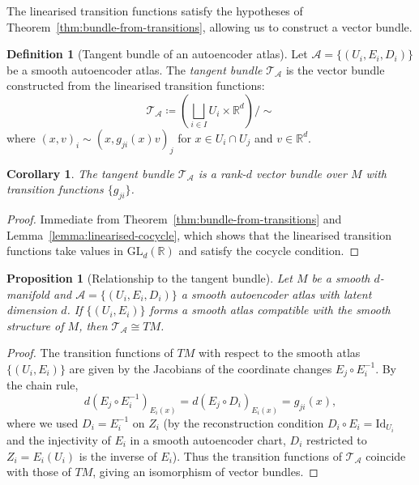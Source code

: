 \documentclass[11pt]{article}
\newcommand{\R}{\mathbb{R}}
\newcommand{\GL}{\mathrm{GL}}
\theoremstyle{plain}
\newtheorem{proposition}[theorem]{Proposition}
\newtheorem{corollary}[theorem]{Corollary}
\theoremstyle{definition}
\newtheorem{definition}[theorem]{Definition}
\theoremstyle{remark}
\begin{document}
The linearised transition functions satisfy the hypotheses of Theorem~\ref{thm:bundle-from-transitions}, allowing us to construct a vector bundle.

\begin{definition}[Tangent bundle of an autoencoder atlas]\label{def:tangent-bundle}
Let $\mathcal{A} = \{(U_i, E_i, D_i)\}$ be a smooth autoencoder atlas. The \emph{tangent bundle} $\mathcal{T}_{\mathcal{A}}$ is the vector bundle constructed from the linearised transition functions:
\[
\mathcal{T}_{\mathcal{A}} \coloneqq \left( \bigsqcup_{i \in I} U_i \times \R^d \right)\Big/ \sim
\]
where $(x, v)_i \sim (x, g_{ji}(x) v)_j$ for $x \in U_i \cap U_j$ and $v \in \R^d$.
\end{definition}

\begin{corollary}\label{cor:tangent-bundle-is-vector-bundle}
The tangent bundle $\mathcal{T}_{\mathcal{A}}$ is a rank-$d$ vector bundle over $M$ with transition functions $\{g_{ji}\}$.
\end{corollary}

\begin{proof}
Immediate from Theorem~\ref{thm:bundle-from-transitions} and Lemma~\ref{lemma:linearised-cocycle}, which shows that the linearised transition functions take values in $\GL_d(\R)$ and satisfy the cocycle condition.
\end{proof}

\begin{proposition}[Relationship to the tangent bundle]\label{prop:tangent-bundle-isomorphism}
Let $M$ be a smooth $d$-manifold and $\mathcal{A} = \{(U_i, E_i, D_i)\}$ a smooth autoencoder atlas with latent dimension $d$. If $\{(U_i, E_i)\}$ forms a smooth atlas compatible with the smooth structure of $M$, then $\mathcal{T}_{\mathcal{A}} \cong TM$.
\end{proposition}
\begin{proof}
The transition functions of $TM$ with respect to the smooth atlas $\{(U_i, E_i)\}$ are given by the Jacobians of the coordinate changes $E_j \circ E_i^{-1}$. By the chain rule,
 \[
 d(E_j \circ E_i^{-1})_{E_i(x)} = d(E_j \circ D_i)_{E_i(x)} = g_{ji}(x),
 \]
where we used $D_i = E_i^{-1}$ on $Z_i$ (by the reconstruction condition $D_i \circ E_i = \mathrm{Id}_{U_i}$ and the injectivity of $E_i$ in a smooth autoencoder chart, $D_i$ restricted to $Z_i = E_i(U_i)$ is the inverse of $E_i$). Thus the transition functions of $\mathcal{T}_{\mathcal{A}}$ coincide with those of $TM$, giving an isomorphism of vector bundles.
\end{proof}
\end{document}
